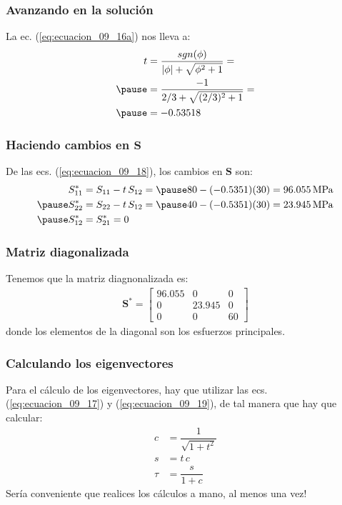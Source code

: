 \documentclass[12pt]{beamer}
\begin{document}
\begin{frame}
\frametitle{Avanzando en la solución}
La ec. (\ref{eq:ecuacion_09_16a}) nos lleva a:
\pause
\begin{eqnarray*}
\begin{aligned}
t &= \dfrac{sgn (\phi)}{\abs{\phi} + \sqrt{\phi^{2} + 1}} = \\ \pause
&= \dfrac{-1}{2/3 + \sqrt{(2/3)^{2} + 1}} = \\ \pause
&= -0.53518
\end{aligned}
\end{eqnarray*}
\end{frame}
\begin{frame}
\frametitle{Haciendo cambios en $\mathbf{S}$}
De las ecs. (\ref{eq:ecuacion_09_18}), los cambios en $\mathbf{S}$ son:
\pause
\begin{eqnarray*}
\begin{aligned}
S_{11}^{*} &= S_{11} - t \, S_{12} = \pause 80 - (-0.5351)(30) = \SI{96.055}{\mega\pascal} \\ \pause 
S_{22}^{*} &= S_{22} - t \, S_{12} = \pause 40 - (-0.5351)(30) = \SI{23.945}{\mega\pascal} \\ \pause 
S_{12}^{*} &= S_{21}^{*} = 0
\end{aligned}
\end{eqnarray*}
\end{frame}
\begin{frame}
\frametitle{Matriz diagonalizada}
Tenemos que la matriz diagnonalizada es:
\pause
\begin{align*}
\mathbf{S}^{*} =
\begin{bmatrix}
96.055 & 0 & 0 \\
0 & 23.945 & 0 \\
0 & 0 & 60
\end{bmatrix}
\end{align*}
donde los elementos de la diagonal son los esfuerzos principales.
\end{frame}
\begin{frame}
\frametitle{Calculando los eigenvectores}
Para el cálculo de los eigenvectores, hay que utilizar las ecs. (\ref{eq:ecuacion_09_17}) y (\ref{eq:ecuacion_09_19}), de tal manera que hay que calcular:
\pause
\begin{align*}
c &= \dfrac{1}{\sqrt{1 + t^{2}}} \\[0.5em]
s &= t \, c \\[0.5em]
\tau &= \dfrac{s}{1+ c}
\end{align*}
Sería conveniente que realices los cálculos a mano, al menos una vez!
\end{frame}
\end{document}
